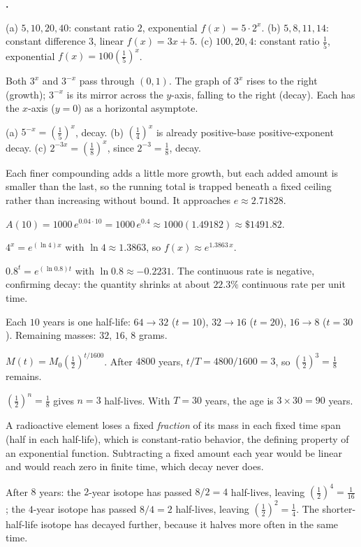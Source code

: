 \documentclass[12pt]{book}
\newcounter{soln}[section]
\newenvironment{solutions}{%
  \setcounter{soln}{0}%
  \begin{list}{\textbf{\arabic{soln}.}}{%
    \usecounter{soln}\setlength{\leftmargin}{2.2em}\setlength{\itemsep}{10pt}}%
}{\end{list}}
\begin{document}
\begin{solutions}
\item (a) $5,10,20,40$: constant ratio $2$, exponential $f(x)=5\cdot2^{x}$. (b)
$5,8,11,14$: constant difference $3$, linear $f(x)=3x+5$. (c) $100,20,4$: constant
ratio $\tfrac15$, exponential $f(x)=100\left(\tfrac15\right)^{x}$.

\item Both $3^x$ and $3^{-x}$ pass through $(0,1)$. The graph of $3^x$ rises to the
right (growth); $3^{-x}$ is its mirror across the $y$-axis, falling to the right
(decay). Each has the $x$-axis ($y=0$) as a horizontal asymptote.

\item (a) $5^{-x}=\left(\tfrac15\right)^{x}$, decay. (b) $\left(\tfrac14\right)^{x}$ is
already positive-base positive-exponent decay. (c) $2^{-3x}=\left(\tfrac18\right)^{x}$,
since $2^{-3}=\tfrac18$, decay.

\item Each finer compounding adds a little more growth, but each added amount is
smaller than the last, so the running total is trapped beneath a fixed ceiling rather
than increasing without bound. It approaches $e\approx2.71828$.

\item $A(10)=1000\,e^{0.04\cdot10}=1000\,e^{0.4}\approx 1000(1.49182)\approx
\$1491.82$.

\item $4^{x}=e^{(\ln 4)x}$ with $\ln 4\approx1.3863$, so $f(x)\approx e^{1.3863\,x}$.

\item $0.8^{t}=e^{(\ln 0.8)t}$ with $\ln 0.8\approx-0.2231$. The continuous rate is
negative, confirming decay: the quantity shrinks at about $22.3\%$ continuous rate per
unit time.

\item Each $10$ years is one half-life: $64\to32$ ($t=10$), $32\to16$ ($t=20$),
$16\to8$ ($t=30$). Remaining masses: $32$, $16$, $8$ grams.

\item $M(t)=M_0\left(\tfrac12\right)^{t/1600}$. After $4800$ years,
$t/T=4800/1600=3$, so $\left(\tfrac12\right)^{3}=\tfrac18$ remains.

\item $\left(\tfrac12\right)^{n}=\tfrac18$ gives $n=3$ half-lives. With $T=30$ years,
the age is $3\times30=90$ years.

\item A radioactive element loses a fixed \emph{fraction} of its mass in each fixed
time span (half in each half-life), which is constant-ratio behavior, the defining
property of an exponential function. Subtracting a fixed amount each year would be
linear and would reach zero in finite time, which decay never does.

\item After $8$ years: the $2$-year isotope has passed $8/2=4$ half-lives, leaving
$\left(\tfrac12\right)^{4}=\tfrac1{16}$; the $4$-year isotope has passed $8/4=2$
half-lives, leaving $\left(\tfrac12\right)^{2}=\tfrac14$. The shorter-half-life isotope
has decayed further, because it halves more often in the same time.
\end{solutions}
\end{document}
